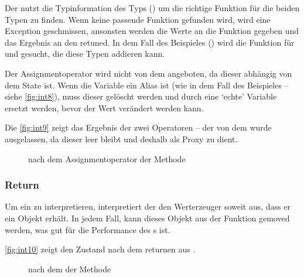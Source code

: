 {{      Der  nutzt die Typinformation des  Typs () um die richtige Funktion für die beiden Typen zu finden. Wenn keine passende Funktion gefunden wird, wird eine Exception geschmissen, ansonsten werden die Werte an die Funktion gegeben und das Ergebnis an den  retuned. In dem Fall des Beispieles () wird die Funktion für  und  gesucht, die diese Typen addieren kann.

      Der Assignmentoperator wird nicht von dem  angeboten, da dieser abhängig von dem  State ist. Wenn die Variable ein Alias ist (wie in dem Fall des Beispieles -- siehe \autoref{fig:int8}), muss dieser gelöscht werden und durch eine `echte' Variable ersetzt werden, bevor der Wert verändert werden kann.

      Die \autoref{fig:int9} zeigt das Ergebnis der zwei Operatoren -- der  von dem  wurde ausgelassen, da dieser leer bleibt und deshalb als Proxy zu  dient.
      \begin{figure}[H]
        \centering
        \caption{ nach dem Assignmentoperator der  Methode}
        \label{fig:int9}
      \end{figure}


    \subsubsection{Return}
    \label{sssec:Return}
      Um ein  zu interpretieren, interpretiert der  den Werterzeuger soweit aus, dass er ein  Objekt erhält. In jedem Fall, kann dieses Objekt aus der Funktion gemoved \autocite[S.268 ff.]{C++14-std} werden, was gut für die Performance des s ist.

      \autoref{fig:int10} zeigt den Zustand nach dem returnen aus .
      \begin{figure}[H]
        \centering
        \caption{ nach dem  der  Methode}
        \label{fig:int10}
      \end{figure}

}}
